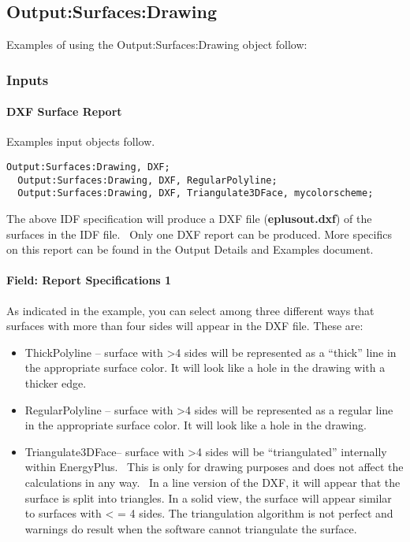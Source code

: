 \subsection{Output:Surfaces:Drawing}\label{outputsurfacesdrawing}

Examples of using the Output:Surfaces:Drawing object follow:

\subsubsection{Inputs}\label{inputs-1-037}

\paragraph{DXF Surface Report}\label{dxf-surface-report}

Examples input objects follow.

\begin{lstlisting}
Output:Surfaces:Drawing, DXF;
  Output:Surfaces:Drawing, DXF, RegularPolyline;
  Output:Surfaces:Drawing, DXF, Triangulate3DFace, mycolorscheme;
\end{lstlisting}

The above IDF specification will produce a DXF file (\textbf{eplusout.dxf}) of the surfaces in the IDF file.~ Only one DXF report can be produced. More specifics on this report can be found in the Output Details and Examples document.

\paragraph{Field: Report Specifications 1}\label{field-report-specifications-1}

As indicated in the example, you can select among three different ways that surfaces with more than four sides will appear in the DXF file. These are:

\begin{itemize}
\item
  ThickPolyline -- surface with \textgreater{}4 sides will be represented as a ``thick'' line in the appropriate surface color. It will look like a hole in the drawing with a thicker edge.
\item
  RegularPolyline -- surface with \textgreater{}4 sides will be represented as a regular line in the appropriate surface color. It will look like a hole in the drawing.
\item
  Triangulate3DFace-- surface with \textgreater{}4 sides will be ``triangulated'' internally within EnergyPlus.~ This is only for drawing purposes and does not affect the calculations in any way.~ In a line version of the DXF, it will appear that the surface is split into triangles. In a solid view, the surface will appear similar to surfaces with \textless{} = 4 sides. The triangulation algorithm is not perfect and warnings do result when the software cannot triangulate the surface.
\end{itemize}

